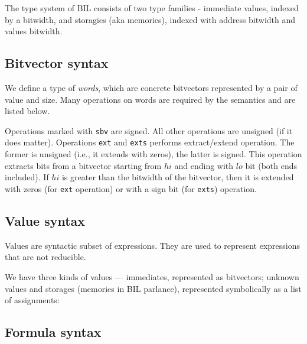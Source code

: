 \documentclass[11pt]{article}
\begin{document}
\ottgrammartabular{
\ottvar\ottinterrule
}

\ottgrammartabular{
\ottbop\ottinterrule
\ottsop\ottinterrule
\ottcop\ottinterrule
\ottuop\ottinterrule
\ottendian\ottinterrule
\ottcast\ottinterrule
}

The type system of BIL consists of two type families - immediate
values, indexed by a bitwidth, and storagies (aka memories), indexed
with address bitwidth and values bitwidth.

\ottgrammartabular{
\otttype\ottinterrule
}

\subsection{Bitvector syntax}
\label{sec:bitvector}

We define a type of {\em words}, which are concrete bitvectors
represented by a pair of value and size.  Many operations on words are
required by the semantics and are listed below.

Operations marked with \verb|sbv| are signed. All other operations are
unsigned (if it does matter).  Operations \verb|ext| and \verb|exts|
performs extract/extend operation. The former is unsigned (i.e., it
extends with zeros), the latter is signed. This operation extracts
bits from a bitvector starting from $\mathit{hi}$ and ending with
$\mathit{lo}$ bit (both ends included). If $\mathit{hi}$ is greater
than the bitwidth of the bitvector, then it is extended with zeros
(for \verb|ext| operation) or with a sign bit (for \verb|exts|)
operation.

\ottgrammartabular{
\ottword\ottinterrule
}

\subsection{Value syntax}
\label{sec:values}

Values are syntactic subset of expressions. They are used to represent
expressions that are not reducible.

We have three kinds of values --- immediates, represented as
bitvectors; unknown values and storages (memories in BIL parlance),
represented symbolically as a list of assignments:

\ottgrammartabular{
\ottval\ottinterrule
}


\subsection{Formula syntax}
\label{sec:formula}
\end{document}
